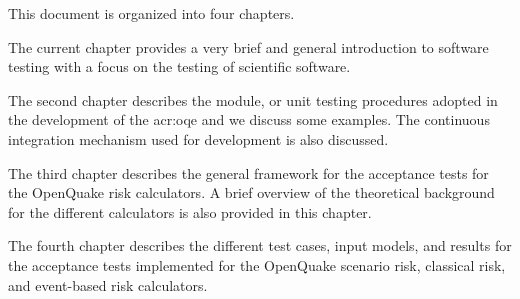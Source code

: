 This document is organized into four chapters.

The current chapter provides a very brief and general introduction to software testing with a focus on the testing of scientific software.

The second chapter describes the module, or unit testing procedures adopted in the development of the \gls{acr:oqe} and we discuss some examples. The continuous integration mechanism used for development is also discussed.

The third chapter describes the general framework for the acceptance tests for the OpenQuake risk calculators. A brief overview of the theoretical background for the different calculators is also provided in this chapter.

The fourth chapter describes the different test cases, input models, and results for the acceptance tests implemented for the OpenQuake scenario risk, classical risk, and event-based risk calculators.




